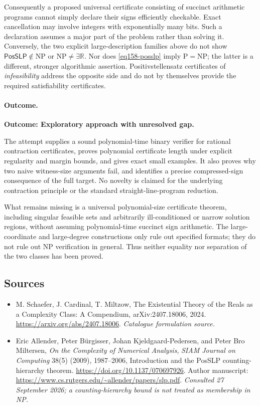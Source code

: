 \documentclass[11pt,a4paper]{article}
\newcommand{\R}{\mathbb{R}}
\numberwithin{equation}{section}
\begin{document}
Consequently a proposed universal certificate consisting of succinct
arithmetic programs cannot simply declare their signs efficiently
checkable. Exact cancellation may involve integers with exponentially
many bits. Such a declaration assumes a major part of the problem rather
than solving it. Conversely, the two explicit large-description families
above do not show $\textsf{PosSLP}\notin\mathrm{NP}$ or
$\mathrm{NP}\ne\exists\R$. Nor does \eqref{eq158-posslp} imply
$\mathrm P=\mathrm{NP}$; the latter is a different, stronger algorithmic
assertion. Positivstellensatz certificates of \emph{infeasibility} address
the opposite side and do not by themselves provide the required
satisfiability certificates.

\paragraph{Outcome.}
\textbf{Outcome: Exploratory approach with unresolved gap.}

The attempt supplies a sound polynomial-time binary verifier for rational
contraction certificates, proves polynomial certificate length under
explicit regularity and margin bounds, and gives exact small examples.
It also proves why two naive witness-size arguments fail, and identifies
a precise compressed-sign consequence of the full target. No novelty is
claimed for the underlying contraction principle or the standard
straight-line-program reduction.

What remains missing is a universal polynomial-size certificate theorem,
including singular feasible sets and arbitrarily ill-conditioned or
narrow solution regions, without assuming polynomial-time succinct sign
arithmetic. The large-coordinate and large-degree constructions only rule
out specified formats; they do not rule out NP verification in general.
Thus neither equality nor separation of the two classes has been proved.
\subsection{Sources}
\begin{itemize}\raggedright
\item[\textnormal{[S1]}]\hypertarget{source:statement:1}{} M. Schaefer, J. Cardinal, T. Miltzow, The Existential Theory of the Reals as a Complexity Class: A Compendium, arXiv:2407.18006, 2024.
\url{https://arxiv.org/abs/2407.18006}.
{\small\textit{Catalogue formulation source.}}
\item[\textnormal{[E1]}]\hypertarget{extra:statement:1}{} Eric Allender, Peter
B\"urgisser, Johan Kjeldgaard-Pedersen, and Peter Bro Miltersen,
\emph{On the Complexity of Numerical Analysis}, \emph{SIAM Journal on
Computing} 38(5) (2009), 1987--2006, Introduction and the PosSLP
counting-hierarchy theorem.
\url{https://doi.org/10.1137/070697926}.
Author manuscript: \url{https://www.cs.rutgers.edu/~allender/papers/slp.pdf}.
{\small\textit{Consulted 27 September 2026; a counting-hierarchy bound is
not treated as membership in NP.}}
\end{itemize}
\end{document}
